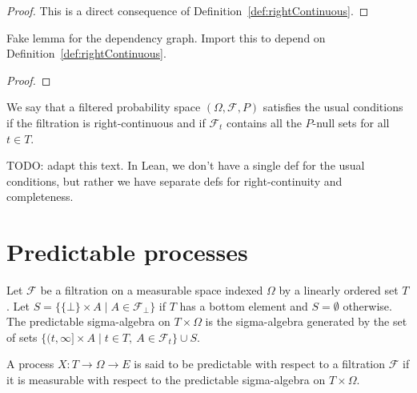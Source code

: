 \begin{proof}  
This is a direct consequence of Definition~\ref{def:rightContinuous}.
\end{proof}

\begin{lemma}\label{lem:rightContinuous_basic}
  \leanok
Fake lemma for the dependency graph. Import this to depend on Definition~\ref{def:rightContinuous}.
\end{lemma}

\begin{proof}\leanok

\end{proof}


\begin{definition}\label{def:hasUsualConditions}
  \leanok
We say that a filtered probability space $(\Omega, \mathcal{F}, P)$ satisfies the usual conditions if the filtration is right-continuous and if $\mathcal{F}_t$ contains all the $P$-null sets for all $t \in T$.
\end{definition}

TODO: adapt this text. In Lean, we don't have a single def for the usual conditions, but rather we have separate defs for right-continuity and completeness.




\section{Predictable processes}


\begin{definition}\label{def:predictableMeasurableSpace}
  \mathlibok
Let $\mathcal{F}$ be a filtration on a measurable space indexed $\Omega$ by a linearly ordered set $T$.
Let $S = \{\{\bot\} \times A \mid A \in \mathcal{F}_\bot\}$ if $T$ has a bottom element and $S = \emptyset$ otherwise.
The predictable sigma-algebra on $T \times \Omega$ is the sigma-algebra generated by the set of sets $\{(t, \infty] \times A \mid t \in T, \: A \in \mathcal{F}_t\} \cup S$.
\end{definition}


\begin{definition}\label{def:predictable}
  \mathlibok
A process $X : T \to \Omega \to E$ is said to be predictable with respect to a filtration $\mathcal{F}$ if it is measurable with respect to the predictable sigma-algebra on $T \times \Omega$.
\end{definition}


